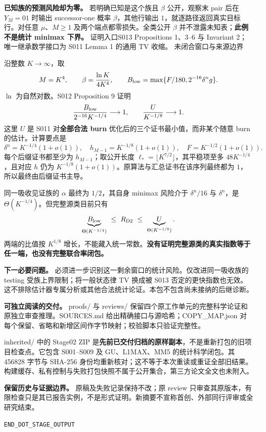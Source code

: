 \documentclass[11pt,a4paper]{article}
\newcommand{\R}{R_{\mathrm{D2}}}\newcommand{\Rp}{R_{\mathrm{D2}}^{+}}
\newcommand{\dd}{\delta}
\newcommand{\head}[2]{{\small\sffamily #1}\par\vspace{2pt}{\LARGE\bfseries #2}\par\vspace{5pt}}
\newcommand{\entry}[1]{\vfill\noindent\small 证明入口\quad #1\normalsize}
\begin{document}
\textbf{已知族的预测风险却为零。} 若明确已知是这个族且 $\beta$ 公开，观察末 pair 后在 $Y_M=01$ 时输出 successor-one 概率 $\beta$，其他行输出 $1$，就逐路径返回真实目标行。对任意 $\mu$、$M\ge1$ 及两个端点都零损失。全类公开 $\beta$ 并不泄露未知表；\textbf{此例不是统计 minimax 下界。}
\entry{S013 Propositions 1、3--6 与 Invariant 2；唯一继承数学接口为 S011 Lemma 1 的通用 TV 收缩。}
\newpage
\head{未闭合窗口与来源边界}{剩余差距是证书差距不是真风险识别}
沿整数 $K\to\infty$，取
\[
 M=K^4,\qquad\beta=\frac{\ln K}{4K^4},\qquad
 B_{\rm low}=\max\{F/180,2^{-16}\dd^n g\}.
\]
$\ln$ 为自然对数。S012 Proposition 9 证明
\[
 \frac{B_{\rm low}}{2^{-16}K^{-1/4}}\longrightarrow1,\qquad
 \frac{U}{K^{-1/8}}\longrightarrow1.
\]
这里 $U$ 是 S011 对\textbf{全部合法 burn} 优化后的三个证书最小值，而非某个随意 burn 的估计。计算要点是
\[
 \dd^n=K^{-1/4}(1+o(1)),\quad
 h_{M-1}=K^{-1/8}(1+o(1)),\quad F=K^{-1/2}(1+o(1)).
\]
每个后缀证书都至少为 $h_{M-1}$；取公开长度
$\ell_* =\lfloor K^{7/2}\rfloor$，其平稳项至多 $48K^{-1/4}$，且对应 $h$ 仍为 $K^{-1/8}(1+o(1))$。原算法与汇总证书在该序列最终都为 $1$，所以最终由后缀证书主导。

同一吸收见证族的 $\alpha$ 最终为 $1/2$，其自身 minimax 风险介于 $\dd^n/16$ 与 $\dd^n$，是 $\Theta(K^{-1/4})$。但完整源类目前只有
\[
 \underbrace{B_{\rm low}}_{\Theta(K^{-1/4})}
 \ \le\ \R\ \le\
 \underbrace{U}_{\Theta(K^{-1/8})}.
\]
两端的比值按 $K^{1/8}$ 增长，不能藏入统一常数。\textbf{没有证明完整源类的真实指数等于任一端，也没有完整联合率闭包。}

\textbf{下一必要问题。} 必须进一步识别这一剩余窗口的统计风险。仅改进同一吸收族的 testing 受族上界限制；将一般状态律 TV 换成被 S013 否定的更快指数也无效。这不排除估计器专属分析或其他合法统计论证。本包不包含尚未接纳的后继诊断。

\textbf{可独立阅读的交付。} proofs/ 与 reviews/ 保留四个原工作单元的完整科学论证和原独立审查推理。SOURCES.md 给出精确接口与源哈希；COPY\_MAP.json 对每个保留、省略和新增区间作字节映射；校验脚本只验证完整性。

inherited/ 中的 Stage02 ZIP 是\textbf{先前已交付归档的原样副本}，不是重新打包的旧项目检查点。它包含 S001--S009 及 GU、L1MAX、MM5 的统计科学闭包。其 456828 字节与 SHA-256 身份均重新核对；这不等于本次重读或重证全部旧结果。构建缓存、私有控制与失败打包快照不属于公开集合，第三方论文全文也未附入。

\textbf{保留历史与证据边界。} 原稿及失败记录保持不改；原 review 只审查其原版本，有限检查只是其已报告实例，不是形式证明。新摘要不宣称首创、外部同行评审或全研究结束。

\vfill\small\texttt{END\_DOT\_STAGE\_OUTPUT}
\end{document}
